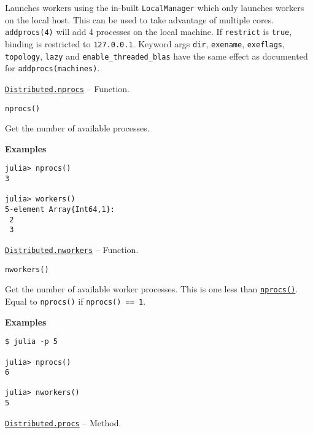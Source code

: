 \begin{adjustwidth}{2em}{0pt}
Launches workers using the in-built \texttt{LocalManager} which only launches workers on the local host. This can be used to take advantage of multiple cores. \texttt{addprocs(4)} will add 4 processes on the local machine. If \texttt{restrict} is \texttt{true}, binding is restricted to \texttt{127.0.0.1}. Keyword args \texttt{dir}, \texttt{exename}, \texttt{exeflags}, \texttt{topology}, \texttt{lazy} and \texttt{enable\_threaded\_blas} have the same effect as documented for \texttt{addprocs(machines)}.



\end{adjustwidth}
\hypertarget{12624410612036310990}{} 
\hyperlink{12624410612036310990}{\texttt{Distributed.nprocs}}  -- {Function.}

\begin{adjustwidth}{2em}{0pt}


\begin{verbatim}
nprocs()
\end{verbatim}

Get the number of available processes.

\textbf{Examples}


\begin{verbatim}
julia> nprocs()
3

julia> workers()
5-element Array{Int64,1}:
 2
 3
\end{verbatim}



\end{adjustwidth}
\hypertarget{7237632848154090273}{} 
\hyperlink{7237632848154090273}{\texttt{Distributed.nworkers}}  -- {Function.}

\begin{adjustwidth}{2em}{0pt}


\begin{verbatim}
nworkers()
\end{verbatim}

Get the number of available worker processes. This is one less than \hyperlink{12624410612036310990}{\texttt{nprocs()}}. Equal to \texttt{nprocs()} if \texttt{nprocs() == 1}.

\textbf{Examples}


\begin{verbatim}
$ julia -p 5

julia> nprocs()
6

julia> nworkers()
5
\end{verbatim}



\end{adjustwidth}
\hypertarget{10683956780105113822}{} 
\hyperlink{10683956780105113822}{\texttt{Distributed.procs}}  -- {Method.}

